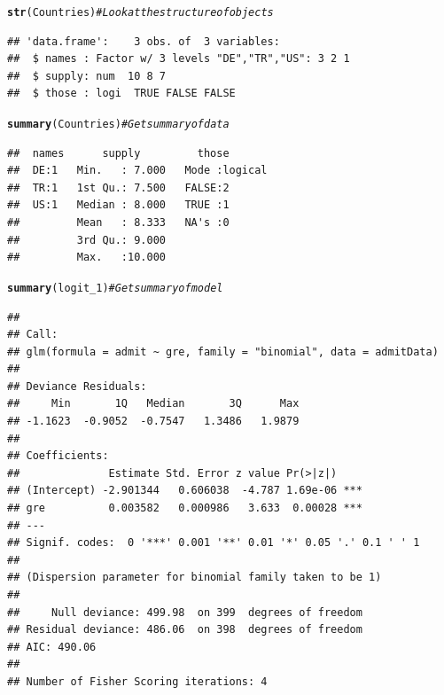 \documentclass{beamer}\usepackage[]{graphicx}\usepackage[]{color}
\makeatletter
\newcommand{\hlcom}[1]{\textcolor[rgb]{0.678,0.584,0.686}{\textit{#1}}}%
\newcommand{\hlstd}[1]{\textcolor[rgb]{0.345,0.345,0.345}{#1}}%
\newcommand{\hlkwd}[1]{\textcolor[rgb]{0.737,0.353,0.396}{\textbf{#1}}}%
\newenvironment{kframe}{%
 \def\at@end@of@kframe{}%
 \ifinner\ifhmode%
  \def\at@end@of@kframe{\end{minipage}}%
  \begin{minipage}{\columnwidth}%
 \fi\fi%
 \def\FrameCommand##1{\hskip\@totalleftmargin \hskip-\fboxsep
 \colorbox{shadecolor}{##1}\hskip-\fboxsep
     \hskip-\linewidth \hskip-\@totalleftmargin \hskip\columnwidth}%
 \MakeFramed {\advance\hsize-\width
   \@totalleftmargin\z@ \linewidth\hsize
   \@setminipage}}%
 {\par\unskip\endMakeFramed%
 \at@end@of@kframe}
\newenvironment{knitrout}{}{} %
\makeatother
\begin{document}
\begin{frame}
\begin{knitrout}\scriptsize
{}\color{fgcolor}\begin{kframe}
\begin{alltt}
\hlkwd{str}\hlstd{(Countries)}  \hlcom{# Look at the structure of objects}
\end{alltt}
\begin{verbatim}
## 'data.frame':	3 obs. of  3 variables:
##  $ names : Factor w/ 3 levels "DE","TR","US": 3 2 1
##  $ supply: num  10 8 7
##  $ those : logi  TRUE FALSE FALSE
\end{verbatim}
\begin{alltt}
\hlkwd{summary}\hlstd{(Countries)}  \hlcom{# Get summary of data}
\end{alltt}
\begin{verbatim}
##  names      supply         those        
##  DE:1   Min.   : 7.000   Mode :logical  
##  TR:1   1st Qu.: 7.500   FALSE:2        
##  US:1   Median : 8.000   TRUE :1        
##         Mean   : 8.333   NA's :0        
##         3rd Qu.: 9.000                  
##         Max.   :10.000
\end{verbatim}
\end{kframe}
\end{knitrout}



\begin{knitrout}\tiny
{}\color{fgcolor}\begin{kframe}
\begin{alltt}
\hlkwd{summary}\hlstd{(logit_1)}  \hlcom{# Get summary of model}
\end{alltt}
\begin{verbatim}
## 
## Call:
## glm(formula = admit ~ gre, family = "binomial", data = admitData)
## 
## Deviance Residuals: 
##     Min       1Q   Median       3Q      Max  
## -1.1623  -0.9052  -0.7547   1.3486   1.9879  
## 
## Coefficients:
##              Estimate Std. Error z value Pr(>|z|)    
## (Intercept) -2.901344   0.606038  -4.787 1.69e-06 ***
## gre          0.003582   0.000986   3.633  0.00028 ***
## ---
## Signif. codes:  0 '***' 0.001 '**' 0.01 '*' 0.05 '.' 0.1 ' ' 1
## 
## (Dispersion parameter for binomial family taken to be 1)
## 
##     Null deviance: 499.98  on 399  degrees of freedom
## Residual deviance: 486.06  on 398  degrees of freedom
## AIC: 490.06
## 
## Number of Fisher Scoring iterations: 4
\end{verbatim}
\end{kframe}
\end{knitrout}


\end{frame}
\end{document}
